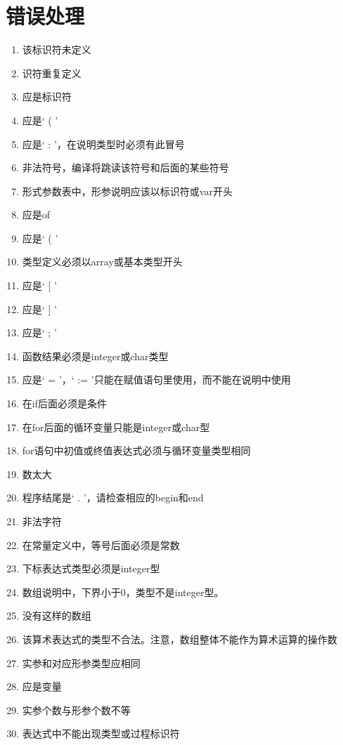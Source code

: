 \section{错误处理}
\begin{enumerate}
        \item 该标识符未定义
        \item 识符重复定义
        \item 应是标识符
        \item 应是‘ ( ’
        \item 应是‘ : ’，在说明类型时必须有此冒号
        \item 非法符号，编译将跳读该符号和后面的某些符号
        \item 形式参数表中，形参说明应该以标识符或var开头
        \item 应是of
        \item 应是‘ ( ’
        \item 类型定义必须以array或基本类型开头
        \item 应是‘ [ ’
        \item 应是‘ ] ’
        \item 应是‘ ; ’
        \item 函数结果必须是integer或char类型
        \item 应是‘ = ’，‘ := ’只能在赋值语句里使用，而不能在说明中使用
        \item 在if后面必须是条件
        \item 在for后面的循环变量只能是integer或char型
        \item for语句中初值或终值表达式必须与循环变量类型相同
        \item 数太大
        \item 程序结尾是‘ . ’，请检查相应的begin和end
        \item 非法字符
        \item 在常量定义中，等号后面必须是常数
        \item 下标表达式类型必须是integer型
        \item 数组说明中，下界小于0，类型不是integer型。
        \item 没有这样的数组
        \item 该算术表达式的类型不合法。注意，数组整体不能作为算术运算的操作数
        \item 实参和对应形参类型应相同
        \item 应是变量
        \item 实参个数与形参个数不等
        \item 表达式中不能出现类型或过程标识符

\end{enumerate}
